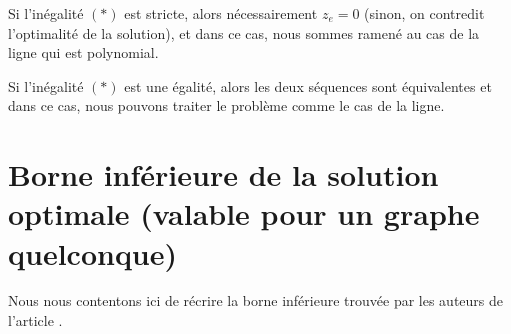 \documentclass[twoside,11pt,openany,a4paper]{rapport}
\begin{document}
Si l'inégalité $(*)$ est stricte, alors nécessairement $z_e = 0$ (sinon, on contredit l'optimalité de la solution), et dans ce cas, nous sommes ramené au cas de la ligne qui est polynomial.

Si l'inégalité $(*)$ est une égalité, alors les deux séquences sont équivalentes et dans ce cas, nous pouvons traiter le problème comme le cas de la ligne.

\section{Borne inférieure de la solution optimale (valable pour un graphe quelconque)}
\label{Borne inf générale}

Nous nous contentons ici de récrire la borne inférieure trouvée par les auteurs de l'article \cite{Benchimol2011}.
\\
\end{document}
